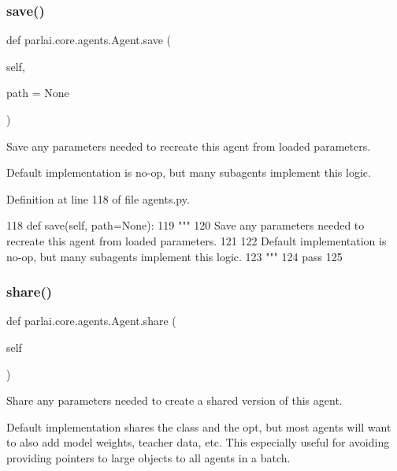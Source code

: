 \subsubsection{\texorpdfstring{save()}{save()}}
{\footnotesize\ttfamily def parlai.\+core.\+agents.\+Agent.\+save (\begin{DoxyParamCaption}\item[{}]{self,  }\item[{}]{path = {\ttfamily None} }\end{DoxyParamCaption})}

\begin{DoxyVerb}Save any parameters needed to recreate this agent from loaded parameters.

Default implementation is no-op, but many subagents implement this logic.
\end{DoxyVerb}
 

Definition at line 118 of file agents.\+py.


\begin{DoxyCode}
118     \textcolor{keyword}{def }save(self, path=None):
119         \textcolor{stringliteral}{"""}
120 \textcolor{stringliteral}{        Save any parameters needed to recreate this agent from loaded parameters.}
121 \textcolor{stringliteral}{}
122 \textcolor{stringliteral}{        Default implementation is no-op, but many subagents implement this logic.}
123 \textcolor{stringliteral}{        """}
124         \textcolor{keywordflow}{pass}
125 
\end{DoxyCode}
\mbox{\label{classparlai_1_1core_1_1agents_1_1Agent_afbbb06bf0f46ff927c8b186726a68b47}} 
\subsubsection{\texorpdfstring{share()}{share()}}
{\footnotesize\ttfamily def parlai.\+core.\+agents.\+Agent.\+share (\begin{DoxyParamCaption}\item[{}]{self }\end{DoxyParamCaption})}

\begin{DoxyVerb}Share any parameters needed to create a shared version of this agent.

Default implementation shares the class and the opt, but most agents will want
to also add model weights, teacher data, etc. This especially useful for
avoiding providing pointers to large objects to all agents in a batch.
\end{DoxyVerb}
 

